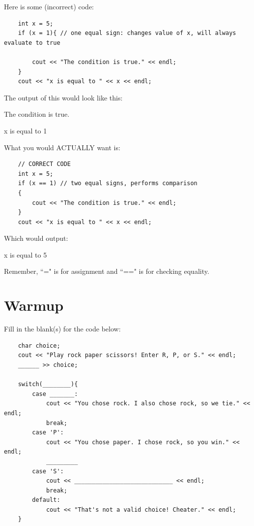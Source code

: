 \begin{example}
    Here is some (incorrect) code:

    \begin{verbatim}
    int x = 5;
    if (x = 1){ // one equal sign: changes value of x, will always evaluate to true
    
    	cout << "The condition is true." << endl;
    }
    cout << "x is equal to " << x << endl;
    \end{verbatim}
    The output of this would look like this:
    \begin{sample}
The condition is true.

x is equal to 1
    \end{sample}
    What you would ACTUALLY want is:
    \begin{verbatim}
    // CORRECT CODE
    int x = 5;
    if (x == 1) // two equal signs, performs comparison
    {
    	cout << "The condition is true." << endl;
    }
    cout << "x is equal to " << x << endl;
    \end{verbatim}
    Which would output:
    \begin{sample}
x is equal to 5
    \end{sample}
\end{example}

Remember, ``=" is for assignment and ``==" is for checking equality.



\section{Warmup}

\begin{problem}
    Fill in the blank(s) for the code below:
    \begin{verbatim}
    char choice;
    cout << "Play rock paper scissors! Enter R, P, or S." << endl;
    ______ >> choice;

    switch(________){
        case _______:
            cout << "You chose rock. I also chose rock, so we tie." << endl;
            break;
        case 'P':
            cout << "You chose paper. I chose rock, so you win." << endl;
            _________
        case 'S':
            cout << ____________________________ << endl;
            break;
        default:
            cout << "That's not a valid choice! Cheater." << endl;
    }
    \end{verbatim}
\end{problem}

